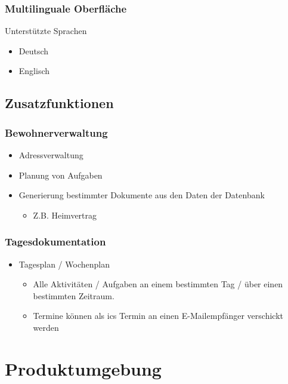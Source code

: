 \documentclass[a4paper,10pt]{article}
\begin{document}
\subsubsection{Multilinguale Oberfläche}
Unterstützte Sprachen
\begin{itemize}
 \item Deutsch
 \item Englisch
\end{itemize}

\subsection{Zusatzfunktionen}
\subsubsection{Bewohnerverwaltung}
\begin{itemize}
	\item Adressverwaltung
	\item Planung von Aufgaben
	\item Generierung bestimmter Dokumente aus den Daten der Datenbank
	\begin{itemize}
		\item Z.B. Heimvertrag
	\end{itemize}
\end{itemize}
\subsubsection{Tagesdokumentation}
\begin{itemize}
	\item Tagesplan / Wochenplan
	\begin{itemize}
		\item Alle Aktivitäten / Aufgaben an einem bestimmten Tag / über einen bestimmten Zeitraum.
		\item Termine können als ics Termin an einen E-Mailempfänger verschickt werden
	\end{itemize}
\end{itemize}

\section{Produktumgebung}
\end{document}
